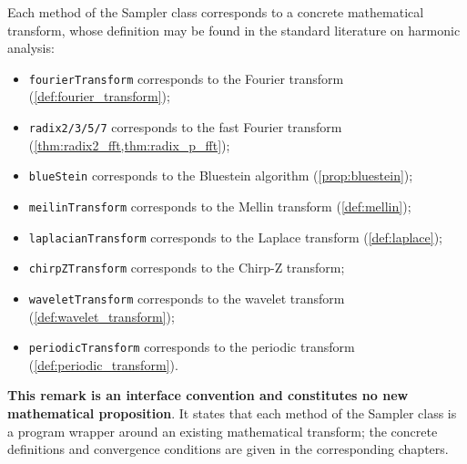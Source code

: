\begin{remark}\label{prop:sampler_methods}
Each method of the Sampler class corresponds to a concrete mathematical transform, whose definition may be found in the standard literature on harmonic analysis:
\begin{itemize}
    \item \texttt{fourierTransform} corresponds to the Fourier transform (\cref{def:fourier_transform});
    \item \texttt{radix2/3/5/7} corresponds to the fast Fourier transform (\cref{thm:radix2_fft,thm:radix_p_fft});
    \item \texttt{blueStein} corresponds to the Bluestein algorithm (\cref{prop:bluestein});
    \item \texttt{meilinTransform} corresponds to the Mellin transform (\cref{def:mellin});
    \item \texttt{laplacianTransform} corresponds to the Laplace transform (\cref{def:laplace});
    \item \texttt{chirpZTransform} corresponds to the Chirp-Z transform;
    \item \texttt{waveletTransform} corresponds to the wavelet transform (\cref{def:wavelet_transform});
    \item \texttt{periodicTransform} corresponds to the periodic transform (\cref{def:periodic_transform}).
\end{itemize}
\textbf{This remark is an interface convention and constitutes no new mathematical proposition}. It states that each method of the Sampler class is a program wrapper around an existing mathematical transform; the concrete definitions and convergence conditions are given in the corresponding chapters.
\end{remark}

\newpage

